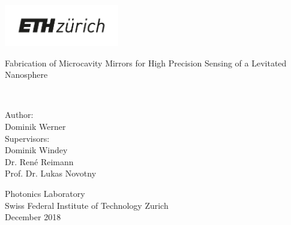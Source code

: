 \thispagestyle{empty}
\begin{flushleft}
	\includegraphics[width=5cm]{source/eth_logo_kurz_pos}
\end{flushleft}


\vspace*{2.2cm}
\begin{center}


{
    \huge\sffamily\bfseries

  

  Fabrication of Microcavity Mirrors for High Precision Sensing of a Levitated Nanosphere\\%
}
	\vspace{3.0cm}
		{\large{}}\\
			\vspace*{2.2cm}

  {\large\sffamily Author:} \\ \vspace{1ex}
  {\large\sffamily Dominik Werner} \\
  \vspace{2.2cm} 
  {\large \sffamily Supervisors:} \\ \vspace{1ex}
  {\large \sffamily Dominik Windey} \\ \vspace{1ex}
  {\large \sffamily Dr. Ren\'{e} Reimann} \\ \vspace{1ex}
  {\large \sffamily Prof. Dr. Lukas Novotny} \\ \vspace{2cm}
  
 
  {\large \sffamily Photonics Laboratory} \\ \vspace{1ex}
  {\large \sffamily Swiss Federal Institute of Technology Zurich} \\ \vspace{2.2cm}
  {\large \sffamily December 2018} \\ \vspace{5ex}

\end{center}

\restoregeometry
